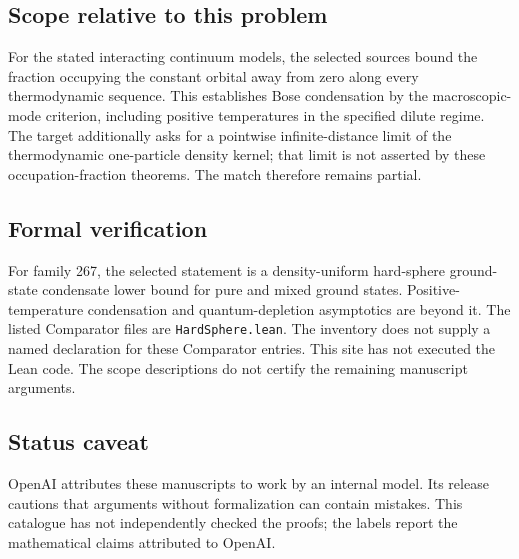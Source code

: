\documentclass[11pt]{article}
\begin{document}
\subsection{Scope relative to this problem}
For the stated interacting continuum models, the selected sources bound the fraction occupying the constant orbital away from zero along every thermodynamic sequence. This establishes Bose condensation by the macroscopic-mode criterion, including positive temperatures in the specified dilute regime. The target additionally asks for a pointwise infinite-distance limit of the thermodynamic one-particle density kernel; that limit is not asserted by these occupation-fraction theorems. The match therefore remains partial.

\subsection{Formal verification}
For family 267, the selected statement is a density-uniform hard-sphere ground-state condensate lower bound for pure and mixed ground states. Positive-temperature condensation and quantum-depletion asymptotics are beyond it. The listed Comparator files are \texttt{HardSphere.lean}. The inventory does not supply a named declaration for these Comparator entries. This site has not executed the Lean code. The scope descriptions do not certify the remaining manuscript arguments.

\subsection{Status caveat}
OpenAI attributes these manuscripts to work by an internal model. Its release cautions that arguments without formalization can contain mistakes. This catalogue has not independently checked the proofs; the labels report the mathematical claims attributed to OpenAI.
\end{document}
